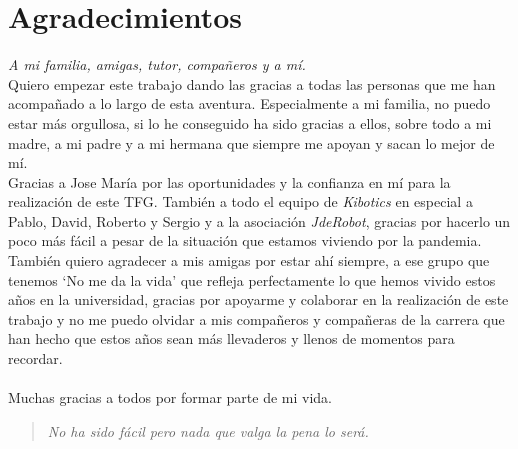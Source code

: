 \newpage
\mbox{}
\thispagestyle{plain}			%
\section*{Agradecimientos}

\textit{A mi familia, amigas, tutor, compañeros y a mí.}\\

Quiero empezar este trabajo dando las gracias a todas las personas que me han acompañado a lo largo de esta aventura. Especialmente a mi familia, no puedo estar más orgullosa, si lo he conseguido ha sido gracias a ellos, sobre todo a mi madre, a mi padre y a mi hermana que siempre me apoyan y sacan lo mejor de mí. \\ 

Gracias a Jose María por las oportunidades y la confianza en mí para la realización de este TFG. También a todo el equipo de \textit{Kibotics} en especial a Pablo, David, Roberto y Sergio y a la asociación \textit{JdeRobot}, gracias por hacerlo un poco más fácil a pesar de la situación que estamos viviendo por la pandemia.\\


También quiero agradecer a mis amigas por estar ahí siempre, a ese grupo que tenemos `No me da la vida' que refleja perfectamente lo que hemos vivido estos años en la universidad, gracias por apoyarme y colaborar en la realización de este trabajo y no me puedo olvidar a mis compañeros y compañeras de la carrera que han hecho que estos años sean más llevaderos y llenos de momentos para recordar.
\\\\
Muchas gracias a todos por formar parte de mi vida. \\

\begin{quote}
  \raggedleft
  \textit{No ha sido fácil pero nada que valga la pena lo será.}
\end{quote}






